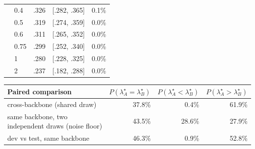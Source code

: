\begin{table}[t]
\begin{tabular}{@{}llrrr@{}}
 & 0.4 & .326 & {\scriptsize [.282, .365]} & 0.1\% \\
 & 0.5 & .319 & {\scriptsize [.274, .359]} & 0.0\% \\
 & 0.6 & .311 & {\scriptsize [.265, .352]} & 0.0\% \\
 & 0.75 & .299 & {\scriptsize [.252, .340]} & 0.0\% \\
 & 1 & .280 & {\scriptsize [.228, .325]} & 0.0\% \\
 & 2 & .237 & {\scriptsize [.182, .288]} & 0.0\% \\
\bottomrule
\end{tabular}
\vspace{2mm}
\begin{tabular}{@{}lrrr@{}}
\toprule
Paired comparison & $P(\lambda^{\star}_A{=}\lambda^{\star}_B)$ & $P(\lambda^{\star}_A{<}\lambda^{\star}_B)$ & $P(\lambda^{\star}_A{>}\lambda^{\star}_B)$ \\
\midrule
cross-backbone (shared draw) & 37.8\% & 0.4\% & 61.9\% \\
same backbone, two independent draws (noise floor) & 43.5\% & 28.6\% & 27.9\% \\
dev vs test, same backbone & 46.3\% & 0.9\% & 52.8\% \\
\bottomrule
\end{tabular}
\end{table}

